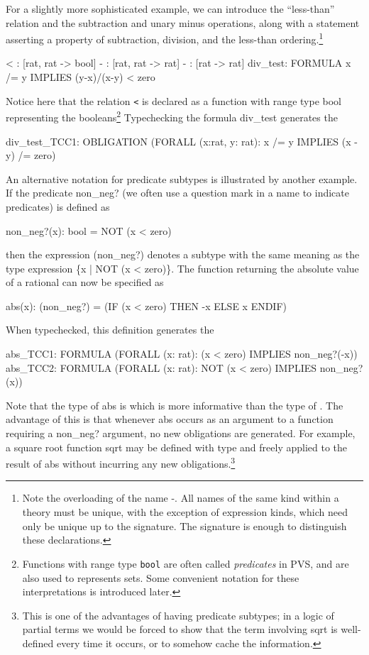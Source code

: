 For a slightly more sophisticated example, we can introduce the
``less-than'' relation and the subtraction and unary minus operations,
along with a statement asserting a property of subtraction, division, and
the less-than ordering.\footnote{Note the overloading of the name {\stt -}.
All names of the same kind within a theory must be unique, with the
exception of expression kinds, which need only be unique up to the
signature. The signature is enough to distinguish these declarations.}
\begin{pvsexample}
  < : [rat, rat -> bool]
  - : [rat, rat -> rat]
  - : [rat -> rat]
  div_test: FORMULA x /= y IMPLIES (y-x)/(x-y) < zero
\end{pvsexample}
%
Notice here that the relation {\tt <} is declared as a function with
range type {\stt bool} representing the booleans\footnote{Functions
with range type {\tt bool} are often called {\em predicates\/} in PVS,
and are also used to represents sets.  Some convenient notation for
these interpretations is introduced later.} Typechecking the formula
{\stt div\_test} generates the \tcc\
\begin{pvsexample}
div_test_TCC1: OBLIGATION
    (FORALL (x:rat, y: rat): x /= y IMPLIES (x - y) /= zero)
\end{pvsexample}
%
An alternative notation for predicate subtypes is illustrated by another
example.  If the predicate {\stt non\_neg?} (we often use a question
mark in a name to indicate predicates) is defined as
\begin{pvsexample}
non_neg?(x): bool = NOT (x < zero)
\end{pvsexample}
%
then the expression {\stt (non\_neg?)} denotes a subtype with the same
meaning as the type expression {\stt \{x | NOT (x < zero)\}}.  The
function returning the absolute value of a rational can now be specified as
\begin{pvsexample}
abs(x): (non_neg?) = (IF (x < zero) THEN -x ELSE x ENDIF)
\end{pvsexample}
%
When typechecked, this definition generates the \tccs
\begin{pvsexample}
  abs_TCC1: FORMULA
    (FORALL (x: rat): (x < zero) IMPLIES non_neg?(-x))
  abs_TCC2: FORMULA
    (FORALL (x: rat): NOT (x < zero) IMPLIES non_neg?(x))
\end{pvsexample}
%
Note that the type of {\stt abs} is {} which
is more informative than the type of {\stt [rat -> rat]}.  The advantage
of this is that whenever {\stt abs} occurs as an argument to a function
requiring a {\stt non\_neg?} argument, no new obligations are generated.
For example, a square root function {\stt sqrt} may be defined with type
{\stt [(non\_neg?) -> (non\_neg?)]} and freely applied to the result of
{\stt abs} without incurring any new obligations.\footnote{This is one of
the advantages of having predicate subtypes; in a logic of partial terms
we would be forced to show that the term involving {\stt sqrt} is
well-defined every time it occurs, or to somehow cache the information.}

